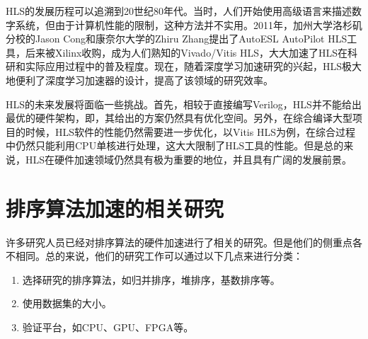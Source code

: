 HLS的发展历程可以追溯到20世纪80年代。当时，人们开始使用高级语言来描述数字系统，但由于计算机性能的限制，这种方法并不实用。2011年，加州大学洛杉矶分校的Jason Cong和康奈尔大学的Zhiru Zhang提出了AutoESL AutoPilot HLS工具\cite{cong2011high}，后来被Xilinx收购，成为人们熟知的Vivado/Vitis HLS，大大加速了HLS在科研和实际应用过程中的普及程度。\cite{hlsbook}\cite{pp4fpgas}现在，随着深度学习加速研究的兴起，HLS极大地便利了深度学习加速器的设计，提高了该领域的研究效率。

HLS的未来发展将面临一些挑战。首先，相较于直接编写Verilog，HLS并不能给出最优的硬件架构，即，其给出的方案仍然具有优化空间。另外，在综合编译大型项目的时候，HLS软件的性能仍然需要进一步优化，以Vitis HLS为例，在综合过程中仍然只能利用CPU单核进行处理，这大大限制了HLS工具的性能。\cite{cong2022fpga}但是总的来说，HLS在硬件加速领域仍然具有极为重要的地位，并且具有广阔的发展前景。


\section{排序算法加速的相关研究}

许多研究人员已经对排序算法的硬件加速进行了相关的研究。但是他们的侧重点各不相同。总的来说，他们的研究工作可以通过以下几点来进行分类：
\begin{enumerate}
    \item 选择研究的排序算法，如归并排序，堆排序，基数排序等。
    \item 使用数据集的大小。
    \item 验证平台，如CPU、GPU、FPGA等。
\end{enumerate}

